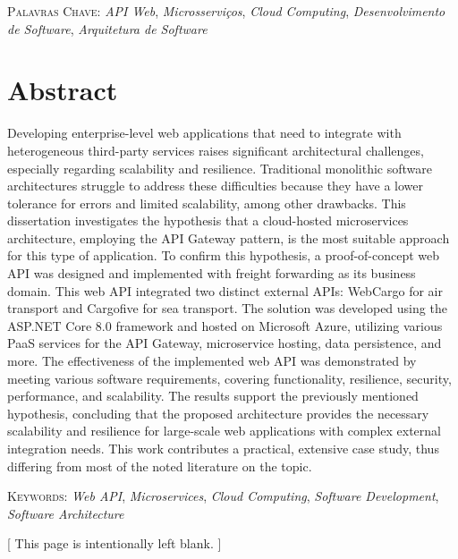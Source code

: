 \documentclass[12pt, reqno]{amsbook}
\makeatletter
\theoremstyle{definition}
\theoremstyle{definition}
\numberwithin{section}{chapter}
\numberwithin{table}{chapter}
\numberwithin{figure}{chapter}
\def\cleardoublepage{\clearpage\if@twoside%
  \ifodd\c@page\else
  \vspace*{\fill}
  \hfill
  \begin{center}
  {\fontfamily{Montserrat-TOsF}\selectfont\small [ This page is intentionally left blank. ]}

  \end{center}
  \vspace{\fill}
  \thispagestyle{empty}
  \newpage
 \if@twocolumn\hbox{}\newpage\fi\fi\fi
}
\makeatother
\begin{document}
\vspace{3ex}
\textsc{Palavras Chave:} \textit{API Web}, \textit{Microsserviços}, \textit{Cloud Computing}, \textit{Desenvolvimento de Software}, \textit{Arquitetura de Software}

\chapter*{Abstract}

Developing enterprise-level web applications that need to integrate with heterogeneous third-party services raises significant architectural challenges, especially regarding scalability and resilience. Traditional monolithic software architectures struggle to address these difficulties because they have a lower tolerance for errors and limited scalability, among other drawbacks. This dissertation investigates the hypothesis that a cloud-hosted microservices architecture, employing the \ac{API} Gateway pattern, is the most suitable approach for this type of application. To confirm this hypothesis, a proof-of-concept web \ac{API} was designed and implemented with freight forwarding as its business domain. This web API integrated two distinct external \acp{API}: WebCargo for air transport and Cargofive for sea transport. The solution was developed using the ASP.NET Core 8.0 framework and hosted on Microsoft Azure, utilizing various \ac{PaaS} services for the \ac{API} Gateway, microservice hosting, data persistence, and more. The effectiveness of the implemented web \ac{API} was demonstrated by meeting various software requirements, covering functionality, resilience, security, performance, and scalability. The results support the previously mentioned hypothesis, concluding that the proposed architecture provides the necessary scalability and resilience for large-scale web applications with complex external integration needs. This work contributes a practical, extensive case study, thus differing from most of the noted literature on the topic.

\vspace{3ex}
\textsc{Keywords:} \textit{Web API}, \textit{Microservices}, \textit{Cloud Computing}, \textit{Software Development}, \textit{Software Architecture}

\tableofcontents
\listoffigures
\listoftables
\cleardoublepage
\end{document}

